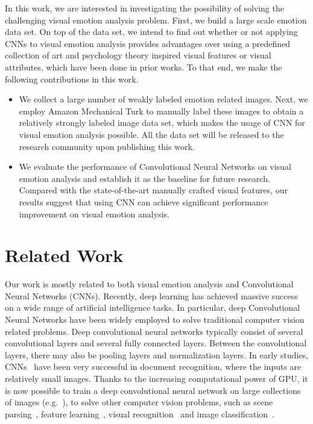 \documentclass[letterpaper]{article}
\begin{document}
In this work, we are interested in investigating the possibility of solving the challenging visual emotion analysis problem. First, we build a large scale emotion data set. On top of the data set, we intend to find out whether or not applying CNNs to visual emotion analysis provides advantages over using a predefined collection of art and psychology theory inspired visual features or visual attributes, which have been done in prior works. To that end, we make the following contributions in this work.

\begin{itemize}
\item{We collect a large number of weakly labeled emotion related images. Next, we employ Amazon Mechanical Turk to manually label these images to obtain a relatively strongly labeled image data set, which makes the usage of CNN for visual emotion analysis possible. All the data set will be released to the research community upon publishing this work.}
\item{We evaluate the performance of Convolutional Neural Networks on visual emotion analysis and establish it as the baseline for future research. Compared with the state-of-the-art manually crafted visual features, our results suggest that using CNN can achieve significant performance improvement on visual emotion analysis.}
\end{itemize}
\section{Related Work}
\label{sec:related}
Our work is mostly related to both visual emotion analysis and Convolutional Neural Networks (CNNs). Recently, deep learning has achieved massive success on a wide range of artificial intelligence tasks. In particular, deep Convolutional Neural Networks have been widely employed to solve traditional computer vision related problems. Deep convolutional neural networks typically consist of several convolutional layers and several fully connected layers. Between the convolutional layers, there may also be pooling layers and normalization layers. In early studies, CNNs~\cite{lecun1998gradient} have been very successful in document recognition, where the inputs are relatively small images. Thanks to the increasing computational power of GPU, it is now possible to train a deep convolutional neural network on large collections of images (e.g.~\cite{krizhevsky2012imagenet}), to solve other computer vision problems, such as scene parsing~\cite{grangier2009deep}, feature learning~\cite{lecun2010convolutional}, visual recognition~\cite{kavukcuoglu2010learning} and image classification~\cite{krizhevsky2012imagenet}.
\end{document}
